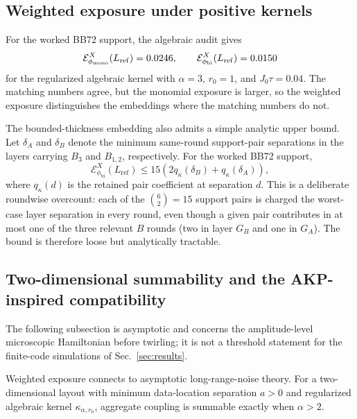 \documentclass[
aps,
prx,
10pt,
twocolumn,
groupedaddress,
longbibliography,
nofootinbib,
floatfix
]{revtex4-2}
\theoremstyle{definition}
\newcommand{\Ew}{\mathcal{E}}
\begin{document}
\subsection{Weighted exposure under positive kernels}

For the worked BB72 support, the algebraic audit gives
\begin{equation}
\Ew^X_{\phi_{\mathrm{mono}}}(L_{\mathrm{ref}})=\bbSeventyTwoMonoExposure{},
\qquad
\Ew^X_{\phi_{\mathrm{bi}}}(L_{\mathrm{ref}})=\bbSeventyTwoBiExposure{}
\end{equation}
for the regularized algebraic kernel with $\alpha=3$, $r_0=1$, and $J_0\tau=0.04$. The matching numbers agree, but the monomial exposure is larger, so the weighted exposure distinguishes the embeddings where the matching numbers do not.

The bounded-thickness embedding also admits a simple analytic upper bound. Let $\delta_A$ and $\delta_B$ denote the minimum same-round support-pair separations in the layers carrying $B_3$ and $B_{1,2}$, respectively. For the worked BB72 support,
\begin{equation}
\Ew^X_{\phi_{\mathrm{bi}}}(L_{\mathrm{ref}})
\le 15\left(2q_{\kappa}(\delta_B)+q_{\kappa}(\delta_A)\right),
\label{eq:bi-surrogate-proof}
\end{equation}
where $q_{\kappa}(d)$ is the retained pair coefficient at separation $d$. This is a deliberate roundwise overcount: each of the $\binom{6}{2}=15$ support pairs is charged the worst-case layer separation in every round, even though a given pair contributes in at most one of the three relevant $B$ rounds (two in layer $G_B$ and one in $G_A$). The bound is therefore loose but analytically tractable.

\subsection{Two-dimensional summability and the AKP-inspired compatibility}

The following subsection is asymptotic and concerns the amplitude-level microscopic Hamiltonian before twirling; it is not a threshold statement for the finite-code simulations of Sec.~\ref{sec:results}.

Weighted exposure connects to asymptotic long-range-noise theory. For a two-dimensional layout with minimum data-location separation $a>0$ and regularized algebraic kernel $\kappa_{\alpha,r_0}$, aggregate coupling is summable exactly when $\alpha>2$.
\end{document}
